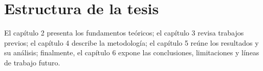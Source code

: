 \section{Estructura de la tesis}

El capítulo 2 presenta los fundamentos teóricos; el capítulo 3 revisa trabajos previos; el capítulo 4 describe la metodología; el capítulo 5 reúne los resultados y su análisis; finalmente, el capítulo 6 expone las conclusiones, limitaciones y líneas de trabajo futuro.
